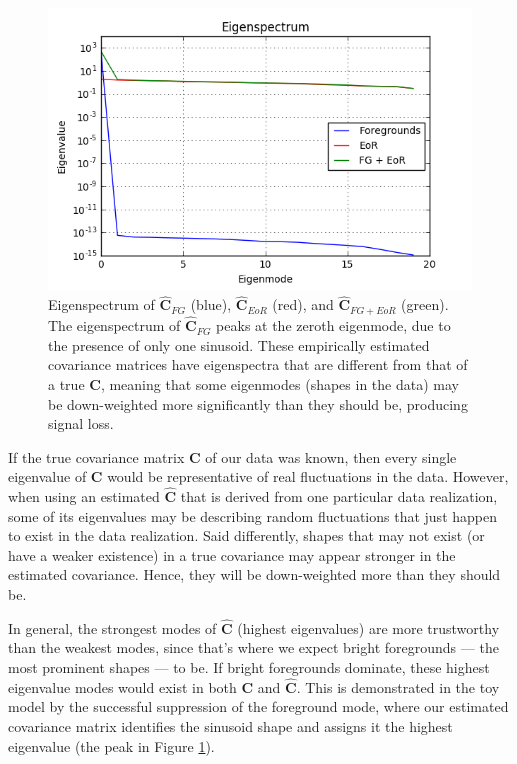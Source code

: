 \documentclass[preprint2,numberedappendix,tighten]{aastex6}  %
\begin{document}
\begin{figure}
	\centering
	\includegraphics[trim={0.3cm 0.2cm 0.3cm 0.3cm},clip,width=\columnwidth]{plots/toy_sigloss2.png}
	\caption{Eigenspectrum of $\hat{\textbf{C}}_{FG}$ (blue), $\hat{\textbf{C}}_{EoR}$ (red), and $\hat{\textbf{C}}_{FG+EoR}$ (green). The eigenspectrum of $\hat{\textbf{C}}_{FG}$ peaks at the zeroth eigenmode, due to the presence of only one sinusoid. These empirically estimated covariance matrices have eigenspectra that are different from that of a true $\textbf{C}$, meaning that some eigenmodes (shapes in the data) may be down-weighted more significantly than they should be, producing signal loss.}
	\label{fig:toy_sigloss2}
\end{figure}

If the true covariance matrix $\textbf{C}$ of our data was known, then every single eigenvalue of $\textbf{C}$ would be representative of real fluctuations in the data. However, when using an estimated $\hat{\textbf{C}}$ that is derived from one particular data realization, some of its eigenvalues may be describing random fluctuations that just happen to exist in the data realization. Said differently, shapes that may not exist (or have a weaker existence) in a true covariance may appear stronger in the estimated covariance. Hence, they will be down-weighted more than they should be.

In general, the strongest modes of $\hat{\textbf{C}}$ (highest eigenvalues) are more trustworthy than the weakest modes, since that's where we expect bright foregrounds --- the most prominent shapes --- to be. If bright foregrounds dominate, these highest eigenvalue modes would exist in both $\textbf{C}$ and $\hat{\textbf{C}}$. This is demonstrated in the toy model by the successful suppression of the foreground mode, where our estimated covariance matrix identifies the sinusoid shape and assigns it the highest eigenvalue (the peak in Figure \ref{fig:toy_sigloss2}). 
\end{document}
